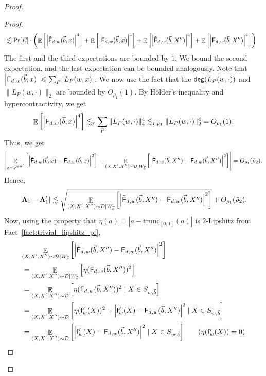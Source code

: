 \documentclass[10pt,a4paper]{amsart}
\newcommand\card[1]{\left| {#1} \right|}
\newcommand\Expect[2]{{\mathop{\mathbb{E}}_{#1}\left[ {#2} \right]}}
\renewcommand\leq{\leqslant}
\newcommand{\V}[1]{{#1}}
\begin{document}
\begin{proof}
\begin{proof}
\begin{align*}
          &\lesssim \Pr[E]\cdot \left(\Expect{}{\card{\truncfcoarsedecoupled_{,\V w}(\vec{b},\V x)}^4} + \Expect{}{ \card{\fcoarsedecoupled_{,\V w}(\vec{b},\V x) }^4} +\Expect{}{\card{\truncfcoarsedecoupled_{,\V w}(\vec{b},\V X'')}^4} + \Expect{}{\card{\fcoarsedecoupled_{,\V w}(\vec{b},\V X'') }^4}\right)
      \end{align*}
      The first and the third expectations are bounded by $1$. We bound the second expectation, and the last expectation can be bounded analogously. Note that $\card{\fcoarsedecoupled_{,\V w}(\vec{b},\V x) } \leq \sum_{P} \card{L_P(w,x)}$. We now use the fact that the ${\sf deg}(L_P(w,\cdot))$ and $\|L_P(w,\cdot)\|_2$ are bounded by $O_{\rho_1}(1)$. By H\"older's inequality and hypercontractivity, we get
      $$\Expect{}{ \card{\fcoarsedecoupled_{,\V w}(\vec{b},\V x) }^4} \lesssim_r \sum_P \|L_P(w,\cdot)\|_4^4 \lesssim_{r, \rho_1} \|L_P(w,\cdot)\|_2^4 = O_{\rho_1}(1).$$
      Thus, we get
      $$\card{\Expect{\substack{\V x\sim \nu^{\otimes n'}}}{\card{\truncfcoarsedecoupled_{,\V w}(\vec{b},\V x) - \fcoarsedecoupled_{,\V w}(\vec{b},\V x) }^2} -\Expect{\substack{(X, X', X'')\sim \mathcal{D}|W_{\vec{b}}}}{\card{\truncfcoarsedecoupled_{,\V w}(\vec{b},\V X'') - \fcoarsedecoupled_{,\V w}(\vec{b},\V X'') }^2} } = O_{\rho_1}(\tilde{\rho}_2).$$
      Hence,
    $$\card{\mathbf{\Lambda}_1 -  \mathbf{\Lambda}'_1 } \lesssim \sqrt{\Expect{\substack{(X, X', X'')\sim \mathcal{D}|W_{\vec{b}}}}{\card{\truncfcoarsedecoupled_{,\V w}(\vec{b}, X'') - \fcoarsedecoupled_{,\V w}(\vec{b}, X'') }^2}}+O_{\rho_1}(\tilde{\rho}_2).$$
    Now, using the property that $\eta(a) = \card{a-\mathrm{trunc}_{[0,1]}(a)}$ is $2$-Lipshitz from Fact~\ref{fact:trivial_lipshitz_pf},
    \begin{align*}
            &\Expect{\substack{(X, X', X'')\sim \mathcal{D}|W_{\vec{b}}}}{\card{\truncfcoarsedecoupled_{,\V w}(\vec{b}, X'') - \fcoarsedecoupled_{,\V w}(\vec{b}, X'') }^2} \\
            &= \Expect{\substack{(X, X', X'')\sim \mathcal{D}|W_{\vec{b}}}}{\eta(\fcoarsedecoupled_{,\V w}(\vec{b}, X''))^2}\\
            &= \Expect{\substack{(X, X', X'')\sim \mathcal{D}}}{\eta(\fcoarsedecoupled_{,\V w}(\vec{b}, X''))^2\mid X\in S_{w,\vec{b}}}\\
            &= \Expect{\substack{(X, X', X'')\sim \mathcal{D}}}{\eta(\noisyfrefined_{\V w}(X))^2 + \card{\noisyfrefined_{\V w}(X) - \fcoarsedecoupled_{,\V w}(\vec{b}, X'')}^2\mid X\in S_{w,\vec{b}}}\\
             &= \Expect{\substack{(X, X', X'')\sim \mathcal{D}}}{\card{\noisyfrefined_{\V w}(X) - \fcoarsedecoupled_{,\V w}(\vec{b}, X'')}^2\mid X\in S_{w,\vec{b}}} \tag*{($\eta(\noisyfrefined_{\V w}(X)) = 0$)}

\end{align*}
\end{proof}
\end{proof}
\end{document}
